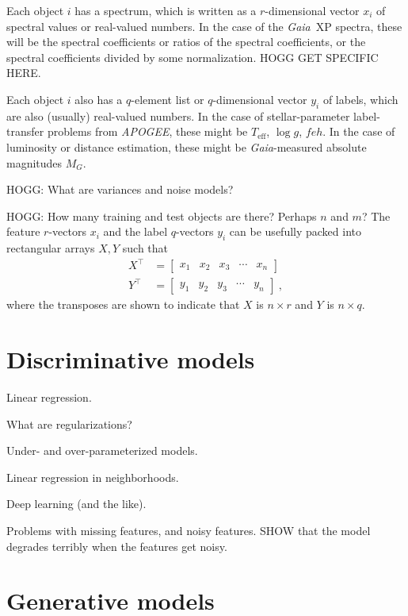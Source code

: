 \documentclass[modern]{aastex631}
\newcommand{\acronym}[1]{\small{#1}}
\newcommand{\project}[1]{\textsl{#1}}
\newcommand{\Gaia}{\project{Gaia}}
\newcommand{\APOGEE}{\project{\acronym{APOGEE}}}
\newcommand{\teff}{{T_{\mathrm{eff}}}}
\newcommand{\logg}{\log g}
\begin{document}
Each object $i$ has a spectrum, which is written as a $r$-dimensional vector $x_i$ of spectral values or real-valued numbers.
In the case of the \Gaia\ XP spectra, these will be the spectral coefficients or ratios of the spectral coefficients, or the spectral coefficients divided by some normalization. HOGG GET SPECIFIC HERE.

Each object $i$ also has a $q$-element list or $q$-dimensional vector $y_i$ of labels, which are also (usually) real-valued numbers.
In the case of stellar-parameter label-transfer problems from \APOGEE, these might be $\teff$, $\logg$, $feh$.
In the case of luminosity or distance estimation, these might be \Gaia-measured absolute magnitudes $M_G$.

HOGG: What are variances and noise models?

HOGG: How many training and test objects are there? Perhaps $n$ and $m$?
The feature $r$-vectors $x_i$ and the label $q$-vectors $y_i$ can be usefully packed into rectangular arrays $X, Y$ such that
\begin{align}
  X^\top &= \begin{bmatrix}x_1 & x_2 & x_3 & \cdots & x_n\end{bmatrix} \\
  Y^\top &= \begin{bmatrix}y_1 & y_2 & y_3 & \cdots & y_n\end{bmatrix} ~,
\end{align}
where the transposes are shown to indicate that $X$ is $n\times r$ and $Y$ is $n\times q$.

\section{Discriminative models}

Linear regression.

What are regularizations?

Under- and over-parameterized models.

Linear regression in neighborhoods.

Deep learning (and the like).

Problems with missing features, and noisy features. SHOW that the model degrades terribly when the features get noisy.

\section{Generative models}
\end{document}
